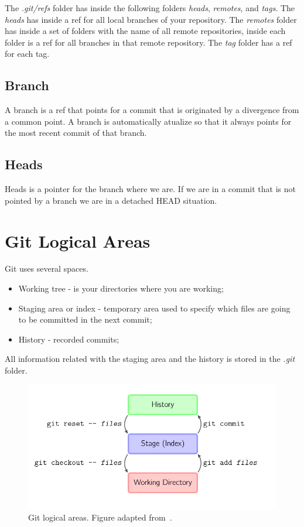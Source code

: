 \begin{refsection}
The \emph{.git/refs} folder has inside the following folders \emph{heads}, \emph{remotes}, and \emph{tags}.
The \emph{heads} has inside a ref for all local branches of your repository.
The \emph{remotes} folder has inside a set of folders with the name of all remote repositories, inside each folder is a ref for all branches in that remote repository.
The \emph{tag} folder has a ref for each tag.


\subsection{Branch}

A branch is a ref that points for a commit that is originated by a divergence from a common point.
A branch is automatically atualize so that it always points for the most recent commit of that branch.

\subsection{Heads}

Heads is a pointer for the branch where we are.
If we are in a commit that is not pointed by a branch we are in a detached HEAD situation.

\section{Git Logical Areas}

Git uses several spaces.

\begin{itemize}
    \item[\textbullet] {Working tree - is your directories where you are working;}
    \item[\textbullet] {Staging area or index - temporary area used to specify which files are going to be committed in the next commit;}
    \item[\textbullet] {History - recorded commits;}
\end{itemize}

All information related with the staging area and the history is stored in the \emph{.git} folder.

\begin{figure}[h!]
  \centering
  \includegraphics[width=12cm]{./chapter/git/figures/git_logical_areas.png}
  \caption{Git logical areas. Figure adapted from~\cite{Lodato19}.}\label{git_logical_areas}
\end{figure}


\end{refsection}
